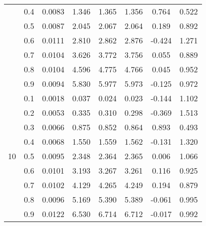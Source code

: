 \documentclass[11pt,a4paper]{report}
\begin{document}
\begin{longtable}{ | c | c || c | c | c | c | c | c | }
 & 0.4 & 0.0083 & 1.346 & 1.365 & 1.356 & 0.764 & 0.522 \\
 & 0.5 & 0.0087 & 2.045 & 2.067 & 2.064 & 0.189 & 0.892 \\
 & 0.6 & 0.0111 & 2.810 & 2.862 & 2.876 & -0.424 & 1.271 \\
 & 0.7 & 0.0104 & 3.626 & 3.772 & 3.756 & 0.055 & 0.889 \\
 & 0.8 & 0.0104 & 4.596 & 4.775 & 4.766 & 0.045 & 0.952 \\
 & 0.9 & 0.0094 & 5.830 & 5.977 & 5.973 & -0.125 & 0.972 \\
 \hline
\multirow{9}{*}{10} & 0.1 & 0.0018 & 0.037 & 0.024 & 0.023 & -0.144 & 1.102 \\
 & 0.2 & 0.0053 & 0.335 & 0.310 & 0.298 & -0.369 & 1.513 \\
 & 0.3 & 0.0066 & 0.875 & 0.852 & 0.864 & 0.893 & 0.493 \\
 & 0.4 & 0.0068 & 1.550 & 1.559 & 1.562 & -0.131 & 1.320 \\
 & 0.5 & 0.0095 & 2.348 & 2.364 & 2.365 & 0.006 & 1.066 \\
 & 0.6 & 0.0101 & 3.193 & 3.267 & 3.261 & 0.116 & 0.925 \\
 & 0.7 & 0.0102 & 4.129 & 4.265 & 4.249 & 0.194 & 0.879 \\
 & 0.8 & 0.0096 & 5.169 & 5.390 & 5.389 & -0.061 & 0.995 \\
 & 0.9 & 0.0122 & 6.530 & 6.714 & 6.712 & -0.017 & 0.992 \\
 \hline
\hline
\end{longtable}
\end{document}
